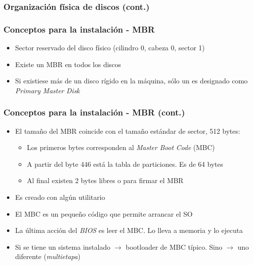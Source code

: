 \begin{frame}
	\frametitle{Organización física de discos (cont.)}
	\begin{figure}
	\end{figure}
\end{frame}

\begin{frame}
	\frametitle{Conceptos para la instalación - \textbf{MBR}}
	\begin{itemize}
		\item Sector reservado del disco físico (cilindro 0, cabeza 0, sector 1)
		\item Existe un MBR en todos los discos
		\item Si existiese más de un disco rígido en la máquina, sólo un es designado como \textit{Primary Master Disk}
	\end{itemize}
\end{frame}

\begin{frame}
	\frametitle{Conceptos para la instalación - MBR (cont.)}
	\begin{itemize}
		\item El tamaño del MBR coincide con el tamaño estándar de sector, 512 bytes:
		\begin{itemize}
			\item Los primeros bytes corresponden al \textit{Master Boot Code} (MBC)
			\item A partir del byte 446 está la tabla de particiones. Es de 64 bytes
			\item Al final existen 2 bytes libres o para firmar el MBR
		\end{itemize}
		\item Es creado con algún utilitario	
		\item El MBC es un pequeño código que permite arrancar el SO
		\item La última acción del \textit{BIOS} es leer el MBC. Lo lleva a memoria y lo ejecuta		
		\item Si se tiene un sistema instalado $\rightarrow$ bootloader de MBC típico. Sino $\rightarrow$ uno diferente (\textit{multietapa})		
	\end{itemize}
\end{frame}

